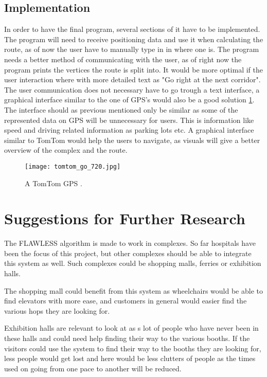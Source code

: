 \subsection{Implementation}

In order to have the final program, several sections of it have to be implemented. The program will need to receive positioning data and use it when calculating the route, as of now the user have to manually type in in where one is. The program needs a better method of communicating with the user, as of right now the program prints the vertices the route is split into. It would be more optimal if the user interaction where with more detailed text as "Go right at the next corridor". The user communication does not necessary have to go trough a text interface, a graphical interface similar to the one of GPS's would also be a good solution \cref{fig:TomTom}. The interface should as previous mentioned only be similar as some of the represented data on GPS will be unnecessary for users. This is information like speed and driving related information as parking lots etc. A graphical interface similar to TomTom would help the users to navigate, as visuals will give a better overview of the complex and the route. 

\begin{figure}[!h]
\centering
    \texttt{[image: tomtom\_go\_720.jpg]}
    \caption{A TomTom GPS \cite{diss_tomtom}.} \label{fig:TomTom}
\end{figure}


\section{Suggestions for Further Research}

The FLAWLESS algorithm is made to work in complexes. So far hospitals have been the focus of this project, but other complexes should be able to integrate this system as well. Such complexes could be shopping malls, ferries or exhibition halls. 

The shopping mall could benefit from this system as wheelchairs would be able to find elevators with more ease, and customers in general would easier find the various hops they are looking for. 

Exhibition halls are relevant to look at as s lot of people who have never been in these halls and could need help finding their way to the various booths. If the visitors could use the system to find their way to the booths they are looking for, less people would get lost and here would be less clutters of people as the times used on going from one pace to another will be reduced. 
\newline 

